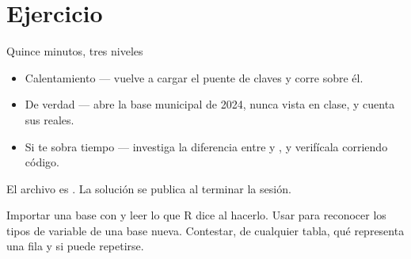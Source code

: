 \section{Ejercicio}

\begin{frame}{Quince minutos, tres niveles}
  \vspace{0.4em}
  \begin{itemize}\setlength{\itemsep}{1.0em}
    \item \ac{Calentamiento} — vuelve a cargar el puente de claves y corre
           sobre él.
    \item \ac{De verdad} — abre la base municipal de 2024, nunca vista en
          clase, y cuenta sus  reales.
    \item \ac{Si te sobra tiempo} — investiga la diferencia entre
           y , y verifícala corriendo código.
  \end{itemize}

  \vspace{1.2em}
  {\small\color{grisTenue}El archivo es . La solución
  se publica al terminar la sesión.}
\end{frame}

\yasabemos
  {Importar una base con  y leer lo que R dice al hacerlo.}
  {Usar  para reconocer los tipos de variable de una base nueva.}
  {Contestar, de cualquier tabla, qué representa una fila y si puede repetirse.}



